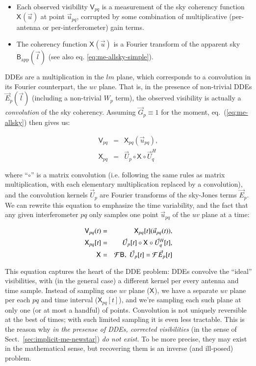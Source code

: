 \documentclass[]{aa}
\newcommand{\herm}{H}
\newcommand{\jones}[2]{\vec {#1}_{#2}}
\newcommand{\jonesT}[2]{\vec {#1}^{\herm}_{#2}}
\newcommand{\coh}[2]{\mathsf{{#1}}_{{#2}}}
\begin{document}
\begin{itemize}
\item Each observed visibility $\coh{V}{pq}$ is a measurement of the sky coherency function $\coh{X}{}(\vec u)$ at point $\vec u_{pq}$, corrupted by some combination of multiplicative (per-antenna or per-interferometer) gain terms.

\item The coherency function $\coh{X}{}(\vec u)$ is a Fourier transform of the apparent sky $\coh{B}{\mathrm{app}}(\vec l)$ (see also eq. \ref{eq:me-allsky-simple}).
\end{itemize}

DDEs are a multiplication in the $lm$ plane, which corresponds to a convolution in its Fourier counterpart, the $uv$ plane. That is, in the presence of non-trivial DDEs $\jones{E}{p}(\vec l)$ (including a non-trivial $W_p$ term), the observed visibility is actually a \emph{convolution} of the sky coherency. Assuming $\jones{G}{p}\equiv1$ for the moment, eq.~(\ref{eq:me-allsky}) then gives us:

\begin{eqnarray}\label{eq:dde-convolution}
\nonumber \coh{V}{pq} & = & \coh{X}{pq}(\vec u_{pq}), \\
\coh{X}{pq} &=& \jones{U}{p} \circ \coh{X}{} \circ \jonesT{U}{q}
\end{eqnarray}

where ``$\circ$'' is a matrix convolution (i.e. following the same rules as matrix multiplication, with each elementary multiplication replaced by a convolution), and the convolution kernels $\jones{U}{p}$ are Fourier transforms of the
sky-Jones terms $\jones{E}{p}$. We can rewrite this equation to emphasize the time variability, and the fact that any given interferometer $pq$ only samples one point $\vec u_{pq}$ of the $uv$ plane at a time:

\begin{eqnarray}\label{eq:dde-convolution-t}
\coh{V}{pq}(t) & = & \coh{X}{pq}[t](\vec u_{pq}(t)), \\
\nonumber \coh{X}{pq}[t] & = & \jones{U}{p}[t] \circ \coh{X}{} \circ \jonesT{U}{q}[t], \\
\nonumber \coh{X}{} & = & {\cal F} \coh{B}{}, \; \jones{U}{p}[t] = {\cal F}\jones{E}{p}[t]
\end{eqnarray}

This equation captures the heart of the DDE problem: DDEs convolve the ``ideal'' visibilities, with (in the general case) a different kernel per every antenna and time sample. Instead of sampling one $uv$ plane ($\coh{X}{}$), we have a separate $uv$ plane per each $pq$ and time interval ($\coh{X}{pq}[t]$), and we're sampling each such plane at only one (or at most a handful) of points. Convolution is not uniquely reversible at the best of times; with such limited sampling it is even less tractable. This is the reason why \emph{in the presense of DDEs, corrected visibilities} (in the sense of Sect.~\ref{sec:implicit-me-newstar}) \emph{do not exist.} To be more precise, they may exist in the mathematical sense, but recovering them is an inverse (and ill-posed) problem.
\end{document}
